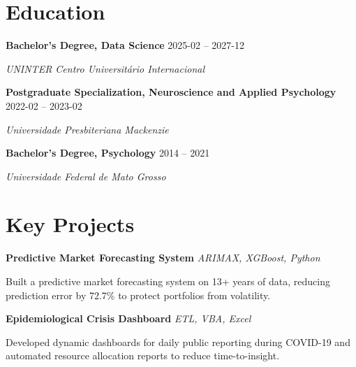 ﻿\documentclass[11pt,a4paper]{article}
\begin{document}
\section*{Education}
\noindent \textbf{Bachelor's Degree, Data Science} \hfill 2025-02 -- 2027-12 \par
\noindent \textit{UNINTER Centro Universitário Internacional} \par \vspace{6pt}
\noindent \textbf{Postgraduate Specialization, Neuroscience and Applied Psychology} \hfill 2022-02 -- 2023-02 \par
\noindent \textit{Universidade Presbiteriana Mackenzie} \par \vspace{6pt}
\noindent \textbf{Bachelor's Degree, Psychology} \hfill 2014 -- 2021 \par
\noindent \textit{Universidade Federal de Mato Grosso} \par \vspace{6pt}


\section*{Key Projects}
\noindent \textbf{Predictive Market Forecasting System} \textbar{} \textit{ARIMAX, XGBoost, Python} \par
\vspace{2pt} Built a predictive market forecasting system on 13+ years of data, reducing prediction error by 72.7\% to protect portfolios from volatility. \par \vspace{6pt}
\noindent \textbf{Epidemiological Crisis Dashboard} \textbar{} \textit{ETL, VBA, Excel} \par
\vspace{2pt} Developed dynamic dashboards for daily public reporting during COVID-19 and automated resource allocation reports to reduce time-to-insight. \par \vspace{6pt}
\end{document}
